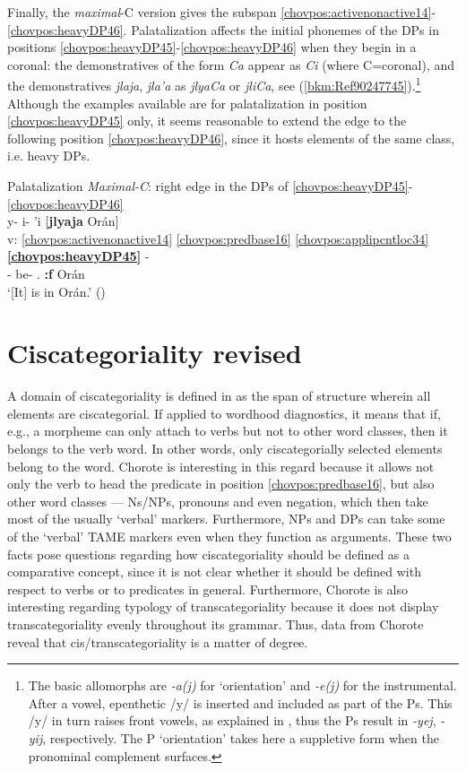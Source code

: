 \documentclass[output=paper]{langscibook}
\begin{document}
Finally, the \textit{maximal}{}-C version gives the subspan \ref{chovpos:activenonactive14}{}-\ref{chovpos:heavyDP46}. Palatalization affects the initial phonemes of the DPs in positions \ref{chovpos:heavyDP45}{}-\ref{chovpos:heavyDP46} when they begin in a coronal: the demonstratives of the form \textit{Ca} appear as \textit{Ci} (where C=coronal), and the demonstratives \textit{jlaja}, \textit{jla'a} as \textit{jlyaCa} or \textit{jliCa}, see (\ref{bkm:Ref90247745}).\footnote{The basic allomorphs are \textit{-a(j)} for `orientation' and \textit{-e(j)} for the instrumental. After a vowel, epenthetic /y/ is inserted and included as part of the Ps. This /y/ in turn raises front vowels, as explained in , thus the Ps result in \textit{-yej}, \textit{{}-yij}, respectively. The P `orientation' takes here a suppletive form when the pronominal complement surfaces.} Although the examples available are for palatalization in position \ref{chovpos:heavyDP45} only, it seems reasonable to extend the edge to the following position \ref{chovpos:heavyDP46}, since it hosts elements of the same class, i.e. heavy DPs.

\ea\label{bkm:Ref90247745}Palatalization \textit{Maximal-C}: right edge in the DPs of \ref{chovpos:heavyDP45}{}-\ref{chovpos:heavyDP46}\\
\glll {} y- i- 'i [\textbf{jlyaja} Orán]\\
    v: \ref{chovpos:activenonactive14} \ref{chovpos:predbase16} \ref{chovpos:applipcntloc34} \textbf{\textup{\ref{chovpos:heavyDP45}}} - \\ 
    {} \Third{}- be- \Ap.\Punct{} \textbf{\Dem{}:f} Orán\\
\glt `[It] is in Orán.' (\citealt[100]{DraysonGomez2000})
\z 


\section{Ciscategoriality revised}
\label{bkm:Ref88847156}
A domain of ciscategoriality is defined in \citet{Tallman2021} as the span of structure wherein all elements are ciscategorial. If applied to wordhood diagnostics, it means that if, e.g., a morpheme can only attach to verbs but not to other word classes, then it belongs to the verb word. In other words, only ciscategorially selected elements belong to the word. Chorote is interesting in this regard because it allows not only the verb to head the predicate in position \ref{chovpos:predbase16}, but also other word classes — Ns/NPs, pronouns and even negation, which then take most of the usually `verbal' markers. Furthermore, NPs and DPs can take some of the `verbal' TAME markers even when they function as arguments. These two facts pose questions regarding how ciscategoriality should be defined as a comparative concept, since it is not clear whether it should be defined with respect to verbs or to predicates in general. Furthermore, Chorote is also interesting regarding typology of transcategoriality \citep{Robert2003} because it does not display transcategoriality evenly throughout its grammar. Thus, data from Chorote reveal that cis/transcategoriality is a matter of degree.
\end{document}
